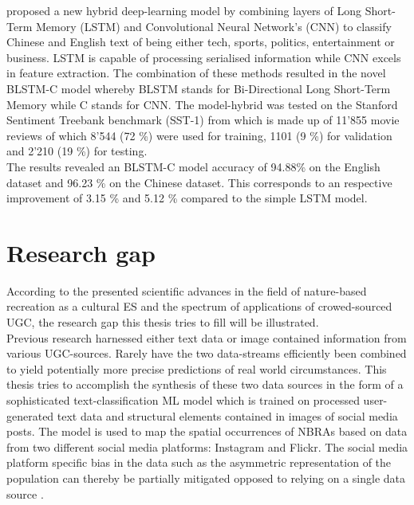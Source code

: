 \textcite{Li2018} proposed a new hybrid deep-learning model by combining layers of Long Short-Term Memory (LSTM) and Convolutional Neural Network's (CNN) to classify Chinese and English text of being either tech, sports, politics, entertainment or business. LSTM is capable of processing serialised information while CNN excels in feature extraction. The combination of these methods resulted in the novel BLSTM-C model whereby BLSTM stands for Bi-Directional Long Short-Term Memory while C stands for CNN. The model-hybrid was tested on the Stanford Sentiment Treebank benchmark (SST-1) from \textcite{Socher2013} which is made up of 11'855 movie reviews of which 8'544 (72 \%) were used for training, 1101 (9 \%) for validation and 2'210 (19 \%) for testing. \\The results revealed an BLSTM-C model accuracy
of 94.88\% on the English dataset and 96.23 \% on the Chinese dataset. This corresponds to an respective improvement of 3.15 \% and 5.12 \% compared to the simple LSTM model.


\section{Research gap}
According to the presented scientific advances in the field of nature-based recreation as a cultural ES and the spectrum of applications of crowed-sourced UGC, the research gap this thesis tries to fill will be illustrated. \\

Previous research harnessed either text data \parencite{Barchiesi2015, Monkman2018, Wartmann2018} or image contained information \parencite{Richards2018, Heikinheimo2017} from various UGC-sources. Rarely have the two data-streams efficiently been combined to yield potentially more precise predictions of real world circumstances. This thesis tries to accomplish the synthesis of these two data sources in the form of a sophisticated text-classification ML model which is trained on processed user-generated text data and structural elements contained in images of social media posts. The model is used to map the spatial occurrences of NBRAs based on data from two different social media platforms: Instagram and Flickr. The social media platform specific bias in the data such as the asymmetric representation of the population can thereby be partially mitigated opposed to relying on a single data source \parencite{Barchiesi2015, Grossenbacher2014, Monkman2018, Mancini2018}. \\

